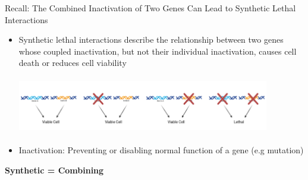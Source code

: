 \documentclass{beamer}
\begin{document}
	\begin{frame}{Recall: The Combined Inactivation of Two Genes Can Lead to Synthetic Lethal Interactions}
		\label{link1}
		
		\begin{itemize}
			\item Synthetic lethal interactions describe the relationship between two genes whose coupled inactivation, but not their individual inactivation, causes cell death or reduces cell viability \newline
				
			\includegraphics[width=11cm, height=2.5cm]{slbasic.png} 
		
			\item Inactivation: Preventing or disabling normal function of a gene (e.g mutation)
			\end{itemize}
			\centering
			\large \textbf{Synthetic = Combining}
	\end{frame}

		
		
\end{document}
